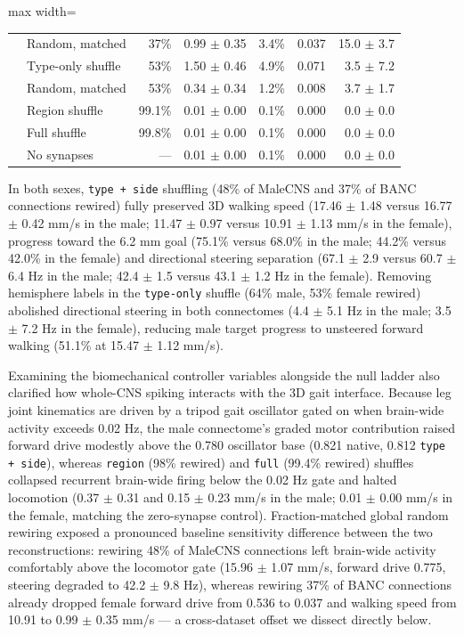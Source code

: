 \documentclass[11pt,a4paper]{article}
\begin{document}
\begin{table}[t]
\begin{adjustbox}{max width=\textwidth}
\begin{tabular}{llrrrrr}
 & Random, matched & 37\% & 0.99 $\pm$ 0.35 & 3.4\% & 0.037 & 15.0 $\pm$ 3.7 \\
 & Type-only shuffle & 53\% & 1.50 $\pm$ 0.46 & 4.9\% & 0.071 & 3.5 $\pm$ 7.2 \\
 & Random, matched & 53\% & 0.34 $\pm$ 0.34 & 1.2\% & 0.008 & 3.7 $\pm$ 1.7 \\
 & Region shuffle & 99.1\% & 0.01 $\pm$ 0.00 & 0.1\% & 0.000 & 0.0 $\pm$ 0.0 \\
 & Full shuffle & 99.8\% & 0.01 $\pm$ 0.00 & 0.1\% & 0.000 & 0.0 $\pm$ 0.0 \\
 & No synapses & --- & 0.01 $\pm$ 0.00 & 0.1\% & 0.000 & 0.0 $\pm$ 0.0 \\
\bottomrule
\end{tabular}
\end{adjustbox}
\end{table}
In both sexes, \texttt{type + side} shuffling (48\% of MaleCNS and 37\% of BANC connections rewired) fully preserved 3D walking speed (17.46 $\pm$ 1.48 versus 16.77 $\pm$ 0.42 mm/s in the male; 11.47 $\pm$ 0.97 versus 10.91 $\pm$ 1.13 mm/s in the female), progress toward the 6.2 mm goal (75.1\% versus 68.0\% in the male; 44.2\% versus 42.0\% in the female) and directional steering separation (67.1 $\pm$ 2.9 versus 60.7 $\pm$ 6.4 Hz in the male; 42.4 $\pm$ 1.5 versus 43.1 $\pm$ 1.2 Hz in the female). Removing hemisphere labels in the \texttt{type-only} shuffle (64\% male, 53\% female rewired) abolished directional steering in both connectomes (4.4 $\pm$ 5.1 Hz in the male; 3.5 $\pm$ 7.2 Hz in the female), reducing male target progress to unsteered forward walking (51.1\% at 15.47 $\pm$ 1.12 mm/s).

Examining the biomechanical controller variables alongside the null ladder also clarified how whole-CNS spiking interacts with the 3D gait interface. Because leg joint kinematics are driven by a tripod gait oscillator gated on when brain-wide activity exceeds 0.02 Hz, the male connectome's graded motor contribution raised forward drive modestly above the 0.780 oscillator base (0.821 native, 0.812 \texttt{type + side}), whereas \texttt{region} (98\% rewired) and \texttt{full} (99.4\% rewired) shuffles collapsed recurrent brain-wide firing below the 0.02 Hz gate and halted locomotion (0.37 $\pm$ 0.31 and 0.15 $\pm$ 0.23 mm/s in the male; 0.01 $\pm$ 0.00 mm/s in the female, matching the zero-synapse control). Fraction-matched global random rewiring exposed a pronounced baseline sensitivity difference between the two reconstructions: rewiring 48\% of MaleCNS connections left brain-wide activity comfortably above the locomotor gate (15.96 $\pm$ 1.07 mm/s, forward drive 0.775, steering degraded to 42.2 $\pm$ 9.8 Hz), whereas rewiring 37\% of BANC connections already dropped female forward drive from 0.536 to 0.037 and walking speed from 10.91 to 0.99 $\pm$ 0.35 mm/s --- a cross-dataset offset we dissect directly below.
\end{document}
